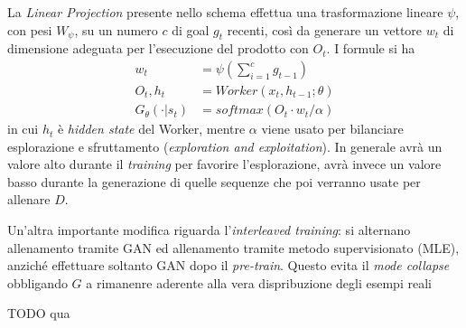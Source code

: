 La \emph{Linear Projection} presente nello schema effettua una trasformazione lineare $\psi$, con pesi $W_\psi$, su un numero $c$ di goal $g_t$ recenti, così da generare un vettore $w_t$ di dimensione adeguata per l'esecuzione del prodotto con $O_t$.
I formule si ha
\begin{align}
  w_t &= \psi \left( \sum_{i=1}^{c} g_{t-1} \right)
  \\
  O_t, h_t &= Worker(x_t, h_{t-1}; \theta)
  \\
  G_\theta(\cdot|s_t) &= softmax ( O_t \cdot w_t / \alpha)
\end{align}
in cui $h_t$ è \emph{hidden state} del Worker, mentre $\alpha$ viene usato per bilanciare esplorazione e sfruttamento (\emph{exploration and exploitation}).
In generale avrà un valore alto durante il \emph{training} per favorire l'esplorazione, avrà invece un valore basso durante la generazione di quelle sequenze che poi verranno usate per allenare $D$.



Un'altra importante modifica riguarda l'\emph{interleaved training}: si alternano allenamento tramite GAN ed allenamento tramite metodo supervisionato (MLE), anziché effettuare soltanto GAN dopo il \emph{pre-train}.
Questo evita il \emph{mode collapse} obbligando $G$ a rimanenre aderente alla vera dispribuzione degli esempi reali 

TODO qua


